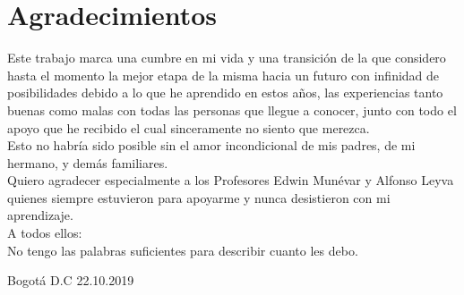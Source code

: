\clearpage
\thispagestyle{empty}
\section*{Agradecimientos}
\label{sec:SOOA}

\vspace{2.5cm}


Este trabajo marca una cumbre en mi vida y una transición de la que considero hasta el momento la mejor etapa de la misma hacia un futuro con infinidad de posibilidades debido a lo que he aprendido en estos años, las experiencias tanto buenas como malas con todas las personas que llegue a conocer, junto con todo el apoyo que he recibido el cual sinceramente no siento que merezca.\\

Esto no habría sido posible sin el amor incondicional de mis padres, de mi hermano, y demás familiares.\\

Quiero agradecer especialmente a los Profesores Edwin Munévar y Alfonso Leyva quienes siempre estuvieron para apoyarme y nunca desistieron con mi aprendizaje.\\


A todos ellos: \\
No tengo las palabras suficientes para describir cuanto les debo.

\vspace{1cm}



\vspace{3cm}
\noindent
\textbf{\thesisauthor{}}

\vspace{0.5cm}
\noindent
Bogotá D.C 22.10.2019
